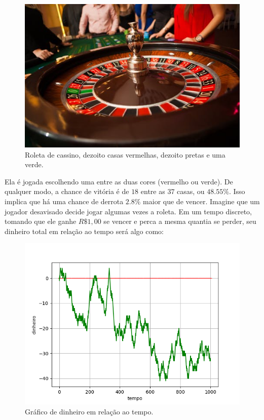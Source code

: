\documentclass[12pt]{article}
\begin{document}
\begin{figure}[H]
\centering
\includegraphics[scale=0.55]{roleta.jpg}
\caption{Roleta de cassino, dezoito casas vermelhas, dezoito pretas e uma verde.}
\end{figure}

Ela é jogada escolhendo uma entre as duas cores (vermelho ou verde). De qualquer modo, a chance de vitória é de $18$ entre as $37$ casas, ou $48.55\%$. Isso implica que há uma chance de derrota $2.8\%$ maior que de vencer. Imagine que um jogador desavisado decide jogar algumas vezes a roleta. Em um tempo discreto, tomando que ele ganhe $R\$1,00$ se vencer e perca a mesma quantia se perder, seu dinheiro total em relação ao tempo será algo como:

\begin{figure}[H]
\centering
\includegraphics[scale=0.7]{graph4.png}
\caption{Gráfico de dinheiro em relação ao tempo.}
\end{figure}
\end{document}
